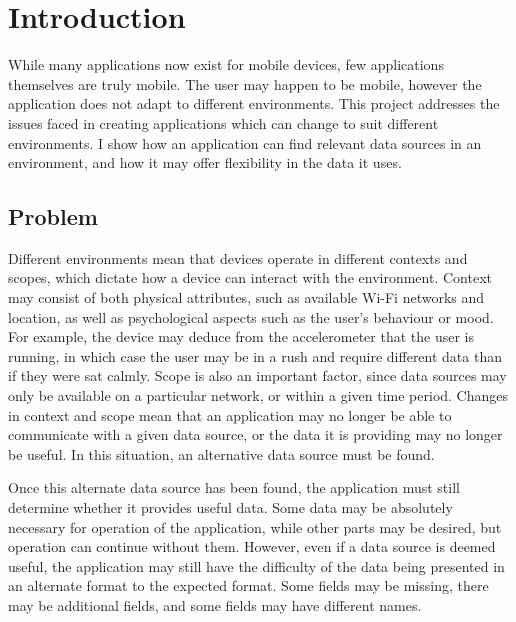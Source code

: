 \documentclass[12pt,twoside,notitlepage]{report}
\begin{document}
\tableofcontents

\listoffigures

\newpage


\cleardoublepage        %

\setcounter{page}{1}
\pagestyle{headings}

\chapter{Introduction}

While many applications now exist for mobile devices, few applications themselves are truly mobile. 
The user may happen to be mobile, however the application does not adapt to different environments. 
This project addresses the issues faced in creating applications which can change to suit different environments. 
I show how an application can find relevant data sources in an environment, and how it may offer flexibility in the data it uses.

\section{Problem}
Different environments mean that devices operate in different contexts and scopes, which dictate how a device can interact with the environment. 
Context may consist of both physical attributes, such as available Wi-Fi networks and location, as well as psychological aspects such as the user's behaviour or mood.
For example, the device may deduce from the accelerometer that the user is running, in which case the user may be in a rush and require different data than if they were sat calmly.
Scope is also an important factor, since data sources may only be available on a particular network, or within a given time period. 
Changes in context and scope mean that an application may no longer be able to communicate with a given data source, or the data it is providing may no longer be useful. 
In this situation, an alternative data source must be found.

Once this alternate data source has been found, the application must still determine whether it provides useful data. 
Some data may be absolutely necessary for operation of the application, while other parts may be desired, but operation can continue without them. 
However, even if a data source is deemed useful, the application may still have the difficulty of the data being presented in an alternate format to the expected format. 
Some fields may be missing, there may be additional fields, and some fields may have different names. 
\end{document}

